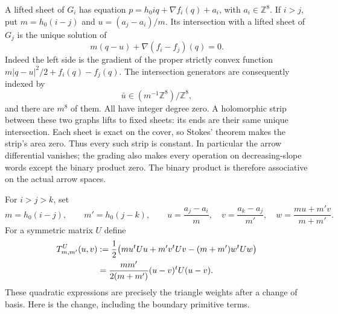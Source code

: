\documentclass[11pt]{article}
\theoremstyle{definition}
\theoremstyle{remark}
\newcommand{\Z}{\mathbb Z}
\numberwithin{equation}{section}
\begin{document}
A lifted sheet of $G_i$ has equation
$p=h_0i q+\nabla f_i(q)+a_i$, with $a_i\in\Z^8$.  If $i>j$, put
$m=h_0(i-j)$ and $u=(a_j-a_i)/m$.  Its intersection with a lifted sheet of
$G_j$ is the unique solution of
\begin{equation}\label{theta:intersection}
 m(q-u)+\nabla(f_i-f_j)(q)=0.
\end{equation}
Indeed the left side is the gradient of the proper strictly convex function
$m|q-u|^2/2+f_i(q)-f_j(q)$.  The intersection generators are consequently
indexed by
\[
 \bar u\in (m^{-1}\Z^8)/\Z^8,
\]
and there are $m^8$ of them.  All have integer degree zero.  A holomorphic
strip between these two graphs lifts to fixed sheets: its ends are their
same unique intersection.  Each sheet is exact on the cover, so Stokes'
theorem makes the strip's area zero.  Thus every such strip is constant.
In particular the arrow differential vanishes; the grading also makes
every operation on decreasing-slope words except the binary product zero.
The binary product is therefore associative on the actual arrow spaces.

For $i>j>k$, set
\[
 m=h_0(i-j),\qquad m'=h_0(j-k),\qquad
 u=\frac{a_j-a_i}{m},\quad v=\frac{a_k-a_j}{m'},\quad
 w=\frac{mu+m'v}{m+m'}.
\]
For a symmetric matrix $U$ define
\begin{align}
 T^U_{m,m'}(u,v)
 &:=\frac12\bigl(mu^tUu+m'v^tUv-(m+m')w^tUw\bigr)\notag\\
 &=\frac{mm'}{2(m+m')}(u-v)^tU(u-v).
 \label{theta:quadratic}
\end{align}
These quadratic expressions are precisely the triangle weights after a
change of basis.  Here is the change, including the boundary primitive
terms.
\end{document}
